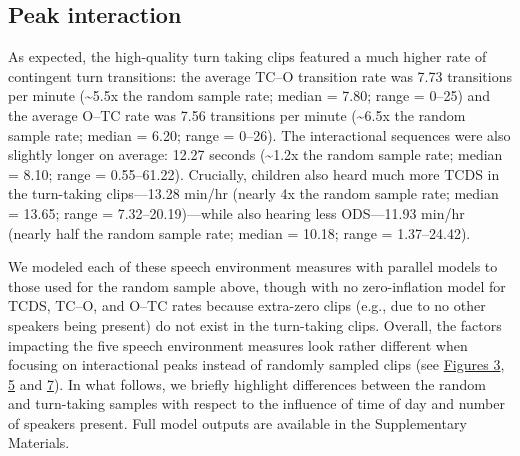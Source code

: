 \documentclass[floatsintext,man]{apa6}
\theoremstyle{definition}
\theoremstyle{definition}
\theoremstyle{definition}
\theoremstyle{remark}
\begin{document}
\subsection{Peak interaction}\label{peak-interaction}

As expected, the high-quality turn taking clips featured a much higher
rate of contingent turn transitions: the average TC--O transition rate
was 7.73 transitions per minute (\textasciitilde{}5.5x the random sample
rate; median = 7.80; range = 0--25) and the average O--TC rate was 7.56
transitions per minute (\textasciitilde{}6.5x the random sample rate;
median = 6.20; range = 0--26). The interactional sequences were also
slightly longer on average: 12.27 seconds (\textasciitilde{}1.2x the
random sample rate; median = 8.10; range = 0.55--61.22). Crucially,
children also heard much more TCDS in the turn-taking clips---13.28
min/hr (nearly 4x the random sample rate; median = 13.65; range =
7.32--20.19)---while also hearing less ODS---11.93 min/hr (nearly half
the random sample rate; median = 10.18; range = 1.37--24.42).

We modeled each of these speech environment measures with parallel
models to those used for the random sample above, though with no
zero-inflation model for TCDS, TC--O, and O--TC rates because extra-zero
clips (e.g., due to no other speakers being present) do not exist in the
turn-taking clips. Overall, the factors impacting the five speech
environment measures look rather different when focusing on
interactional peaks instead of randomly sampled clips (see
\protect\hyperlink{fig3}{Figures 3}, \protect\hyperlink{fig5}{5} and
\protect\hyperlink{fig7}{7}). In what follows, we briefly highlight
differences between the random and turn-taking samples with respect to
the influence of time of day and number of speakers present. Full model
outputs are available in the Supplementary Materials.
\end{document}

